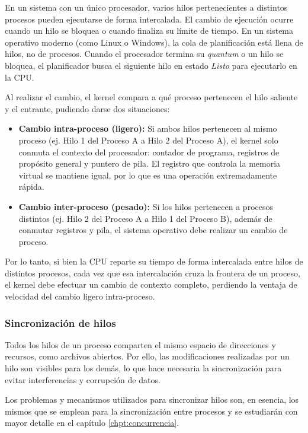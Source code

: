 En un sistema con un único procesador, varios hilos pertenecientes a distintos procesos pueden ejecutarse de forma intercalada. El cambio de ejecución ocurre cuando un hilo se bloquea o cuando finaliza su límite de tiempo. En un sistema operativo moderno (como Linux o Windows), la cola de planificación está llena de hilos, no de procesos. Cuando el procesador termina su \textit{quantum} o un hilo se bloquea, el planificador busca el siguiente hilo en estado \textit{Listo} para ejecutarlo en la CPU.

Al realizar el cambio, el kernel compara a qué proceso pertenecen el hilo saliente y el entrante, pudiendo darse dos situaciones:
\begin{itemize}
  \item \textbf{Cambio intra-proceso (ligero):} Si ambos hilos pertenecen al mismo proceso (ej. Hilo 1 del Proceso A a Hilo 2 del Proceso A), el kernel solo conmuta el contexto del procesador: contador de programa, registros de propósito general y puntero de pila. El registro que controla la memoria virtual se mantiene igual, por lo que es una operación extremadamente rápida.
  \item \textbf{Cambio inter-proceso (pesado):} Si los hilos pertenecen a procesos distintos (ej. Hilo 2 del Proceso A a Hilo 1 del Proceso B), además de conmutar registros y pila, el sistema operativo debe realizar un cambio de proceso.
\end{itemize}

Por lo tanto, si bien la CPU reparte su tiempo de forma intercalada entre hilos de distintos procesos, cada vez que esa intercalación cruza la frontera de un proceso, el kernel debe efectuar un cambio de contexto completo, perdiendo la ventaja de velocidad del cambio ligero intra-proceso.

\subsubsection{Sincronización de hilos}

Todos los hilos de un proceso comparten el mismo espacio de direcciones y recursos, como archivos abiertos. Por ello, las modificaciones realizadas por un hilo son visibles para los demás, lo que hace necesaria la sincronización para evitar interferencias y corrupción de datos.

Los problemas y mecanismos utilizados para sincronizar hilos son, en esencia, los mismos que se emplean para la sincronización entre procesos y se estudiarán con mayor detalle en el capítulo \ref{chpt:concurrencia}.

